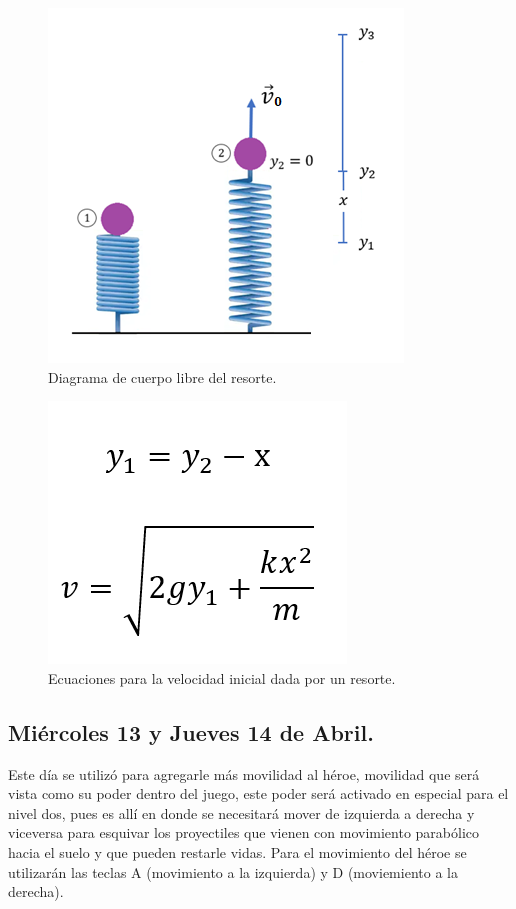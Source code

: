 \documentclass{article}
\begin{document}
\newpage
\begin{figure}[h]
\includegraphics[scale=1]{Images/diagramaresorte.png}
\centering
\caption{Diagrama de cuerpo libre del resorte.}
\label{fig:diagramaresorte}
\end{figure}

\begin{figure}[h]
\includegraphics[scale=0.7]{Images/ecuacionresorte.png}
\centering
\caption{Ecuaciones para la velocidad inicial dada por un resorte.}
\label{fig:ecuacionesresorte}
\end{figure}

\subsection{Miércoles 13 y Jueves 14 de Abril.}
Este día se utilizó para agregarle más movilidad al héroe, movilidad que será vista como su poder dentro del juego, este poder será activado en especial para el nivel dos, pues es allí en donde se necesitará mover de izquierda a derecha y viceversa para esquivar los proyectiles que vienen con movimiento parabólico hacia el suelo y que pueden restarle vidas. Para el movimiento del héroe se utilizarán las teclas A (movimiento a la izquierda) y D (moviemiento a la derecha).
\end{document}
